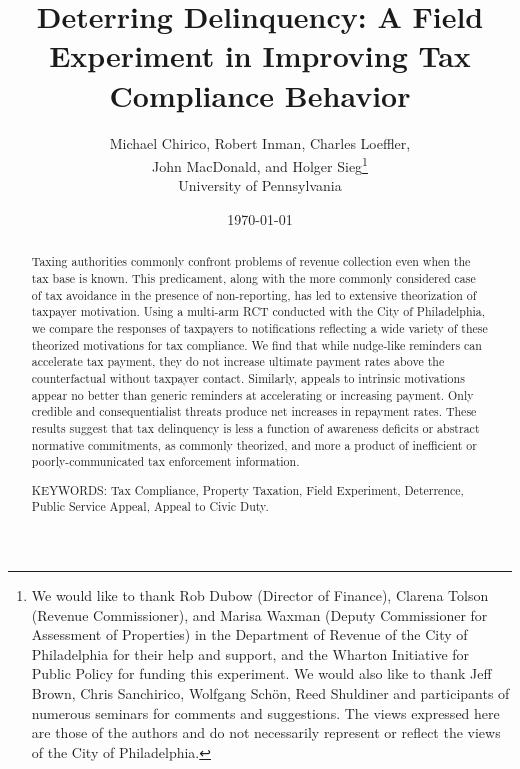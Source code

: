 \documentclass[12pt,titlepage]{article}
\renewcommand{\thefootnote}{\fnsymbol{footnote}}
\begin{document}
\title{Deterring Delinquency: A Field Experiment in Improving Tax Compliance Behavior}

\author{Michael Chirico, Robert Inman, Charles Loeffler, \\
        John MacDonald, and Holger Sieg\thanks{We would like to
        thank Rob Dubow (Director of Finance), Clarena Tolson (Revenue
        Commissioner), and Marisa Waxman (Deputy Commissioner for
        Assessment of Properties) in the Department of Revenue of the City
        of Philadelphia for their help and support, and  the Wharton Initiative for Public Policy for funding this experiment. We would also like to thank Jeff Brown, Chris
    Sanchirico, Wolfgang Sch\"on, Reed Shuldiner and participants of
    numerous seminars for comments and suggestions. The views
    expressed here are those of the authors and do not necessarily
    represent or reflect the views of the City of Philadelphia.}  \\
        University of Pennsylvania}

\date{\today}

\maketitle

\begin{abstract}

Taxing authorities commonly confront problems of revenue collection
even when the tax base is known. This predicament, along with the more
commonly considered case of tax avoidance in the presence of non-reporting,
has led to extensive theorization of taxpayer motivation. Using a multi-arm
RCT conducted with the City of Philadelphia, we compare the responses of
taxpayers to notifications reflecting a wide variety of these theorized motivations
for tax compliance. We find that while nudge-like reminders can accelerate
tax payment, they do not increase ultimate payment rates above
the counterfactual without taxpayer contact.
Similarly, appeals to intrinsic motivations appear no better than generic
reminders at accelerating or increasing payment. Only credible and
consequentialist threats produce net increases in repayment rates. These
results suggest that tax delinquency is less a function of awareness
deficits or abstract normative commitments, as commonly theorized, and
more a product of inefficient or poorly-communicated tax enforcement information.

\noindent KEYWORDS: Tax Compliance, Property Taxation, Field
Experiment, Deterrence, Public Service Appeal, Appeal to Civic Duty.

\end{abstract}
\renewcommand{\thefootnote}{\arabic{footnote}}
\end{document}
